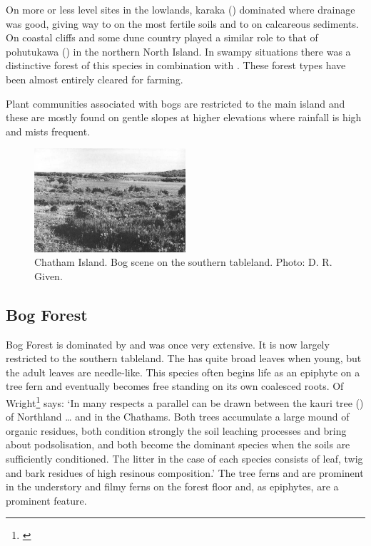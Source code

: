On more or less level sites in the lowlands, karaka () dominated where drainage was good, giving way to  on the most fertile soils and to  on calcareous sediments.
On coastal cliffs and some dune country  played a similar role to that of pohutukawa () in the northern North Island.
In swampy situations there was a distinctive forest of this species in combination with .
These forest types have been almost entirely cleared for farming.

Plant communities associated with bogs are restricted to the main island and these are mostly found on gentle slopes at higher elevations where rainfall is high and mists frequent.

\begin{figure}
	\includegraphics[width=0.5\textwidth]{graphics/figure119chatham-island-bog.jpg}
	\centering
	\caption[Chatham Island bog scene]{Chatham Island.
	Bog scene on the southern tableland.
	Photo: D. R. Given.}%
	\label{fig:119chatham-island-bog}
\end{figure}

\subsection{Bog Forest}

Bog Forest is dominated by  and was once very extensive.
It is now largely restricted to the southern tableland.
The  has quite broad leaves when young, but the adult leaves are needle-like.
This species often begins life as an epiphyte on a tree fern and eventually becomes free standing on its own coalesced roots.
Of  Wright\footnote{\cite{wright1959soils}} says: `In many respects a parallel can be drawn between the kauri tree () of Northland … and  in the Chathams.
Both trees accumulate a large mound of organic residues, both condition strongly the soil leaching processes and bring about podsolisation, and both become the dominant species when the soils are sufficiently conditioned.
The litter in the case of each species consists of leaf, twig and bark residues of high resinous composition.' The tree ferns  and  are prominent in the understory and filmy ferns on the forest floor and, as epiphytes, are a prominent feature.

